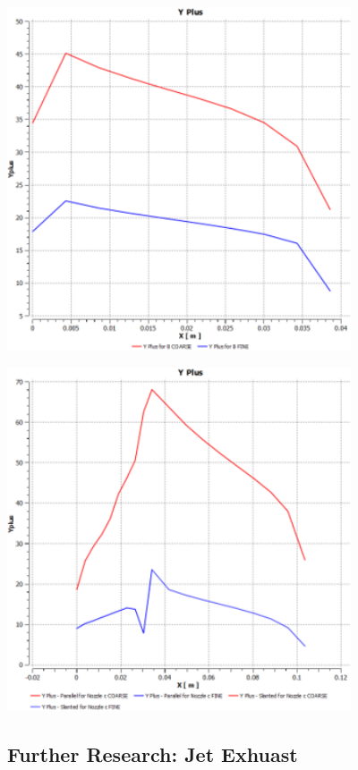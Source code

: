 \documentclass[12pt]{article} %
\begin{document}
\begin{center}
    \includegraphics[width=4in]{YPlus_B.png}
    \label{fig:YPlusB}
\end{center}

\begin{center}
    \includegraphics[width=4in]{YPlus_C.png}
    \label{fig:YPlusC}
\end{center}


\subsection{Further Research: Jet Exhuast}
\end{document}
